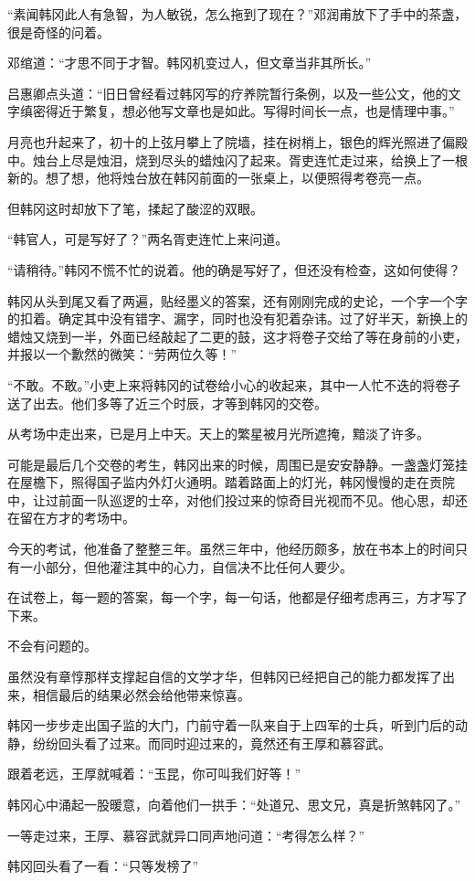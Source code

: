 “素闻韩冈此人有急智，为人敏锐，怎么拖到了现在？”邓润甫放下了手中的茶盏，很是奇怪的问着。

邓绾道：“才思不同于才智。韩冈机变过人，但文章当非其所长。”

吕惠卿点头道：“旧日曾经看过韩冈写的疗养院暂行条例，以及一些公文，他的文字缜密得近于繁复，想必他写文章也是如此。写得时间长一点，也是情理中事。”

月亮也升起来了，初十的上弦月攀上了院墙，挂在树梢上，银色的辉光照进了偏殿中。烛台上尽是烛泪，烧到尽头的蜡烛闪了起来。胥吏连忙走过来，给换上了一根新的。想了想，他将烛台放在韩冈前面的一张桌上，以便照得考卷亮一点。

但韩冈这时却放下了笔，揉起了酸涩的双眼。

“韩官人，可是写好了？”两名胥吏连忙上来问道。

“请稍待。”韩冈不慌不忙的说着。他的确是写好了，但还没有检查，这如何使得？

韩冈从头到尾又看了两遍，贴经墨义的答案，还有刚刚完成的史论，一个字一个字的扣着。确定其中没有错字、漏字，同时也没有犯着杂讳。过了好半天，新换上的蜡烛又烧到一半，外面已经敲起了二更的鼓，这才将卷子交给了等在身前的小吏，并报以一个歉然的微笑：“劳两位久等！”

“不敢。不敢。”小吏上来将韩冈的试卷给小心的收起来，其中一人忙不迭的将卷子送了出去。他们多等了近三个时辰，才等到韩冈的交卷。

从考场中走出来，已是月上中天。天上的繁星被月光所遮掩，黯淡了许多。

可能是最后几个交卷的考生，韩冈出来的时候，周围已是安安静静。一盏盏灯笼挂在屋檐下，照得国子监内外灯火通明。踏着路面上的灯光，韩冈慢慢的走在贡院中，让过前面一队巡逻的士卒，对他们投过来的惊奇目光视而不见。他心思，却还在留在方才的考场中。

今天的考试，他准备了整整三年。虽然三年中，他经历颇多，放在书本上的时间只有一小部分，但他灌注其中的心力，自信决不比任何人要少。

在试卷上，每一题的答案，每一个字，每一句话，他都是仔细考虑再三，方才写了下来。

不会有问题的。

虽然没有章惇那样支撑起自信的文学才华，但韩冈已经把自己的能力都发挥了出来，相信最后的结果必然会给他带来惊喜。

韩冈一步步走出国子监的大门，门前守着一队来自于上四军的士兵，听到门后的动静，纷纷回头看了过来。而同时迎过来的，竟然还有王厚和慕容武。

跟着老远，王厚就喊着：“玉昆，你可叫我们好等！”

韩冈心中涌起一股暖意，向着他们一拱手：“处道兄、思文兄，真是折煞韩冈了。”

一等走过来，王厚、慕容武就异口同声地问道：“考得怎么样？”

韩冈回头看了一看：“只等发榜了”

